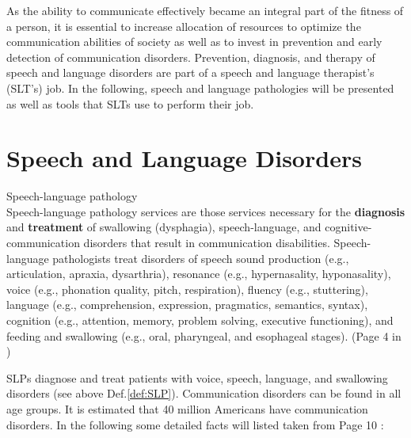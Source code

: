 As the ability to communicate effectively became an integral part of the fitness of a person, it is essential to increase allocation of resources to optimize the communication abilities of society as well as to invest in prevention and early detection of communication disorders. Prevention, diagnosis, and therapy of speech and language disorders are part of a speech and language therapist's (SLT's) job. In the following, speech and language pathologies will be presented as well as tools that SLTs use to perform their job.

\section{Speech and Language Disorders}
\label{sec:SLP}

\theoremstyle{definition}
\begin{definition}{Speech-language pathology\\}
Speech-language pathology services are those services necessary for the \textbf{diagnosis} and \textbf{treatment} of swallowing (dysphagia), speech-language, and cognitive-communication disorders that result in communication disabilities. Speech-language pathologists treat disorders of speech sound production (e.g., articulation, apraxia, dysarthria), resonance (e.g., hypernasality, hyponasality), voice (e.g., phonation quality, pitch, respiration), fluency (e.g., stuttering), language (e.g., comprehension, expression, pragmatics, semantics, syntax), cognition (e.g., attention, memory, problem solving, executive functioning), and feeding and swallowing (e.g., oral, pharyngeal, and esophageal stages). (Page 4 in \cite{SLPathologies})
\label{def:SLP}
\end{definition}

SLPs diagnose and treat patients with voice, speech, language, and swallowing disorders (see above Def.\ref{def:SLP}). Communication disorders can be found in all age groups. It is estimated that 40 million Americans have communication disorders. In the following some detailed facts will listed taken from 
Page 10 \cite{SLPathologies}:

